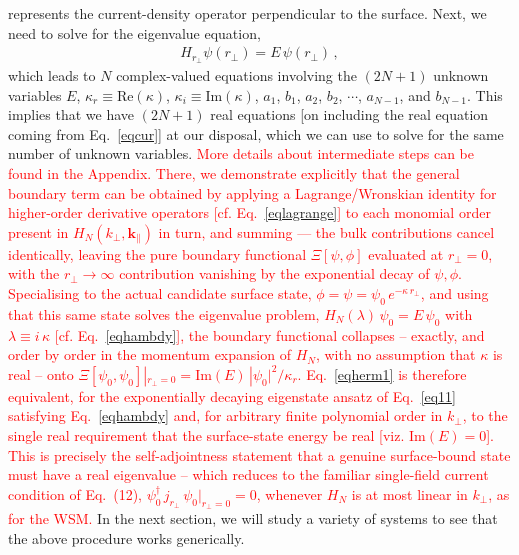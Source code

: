 \documentclass[aps,prb,onecolumn, footinbib, 10pt]{revtex4-2}
\begin{document}
represents the current-density operator perpendicular to the surface. Next, we need to solve for the eigenvalue equation,
\begin{align}
\label{eqhambdy}
H_{r_\perp} \psi (r_\perp) = E\, \psi (r_\perp)\,,
\end{align}
which leads to $N$ complex-valued equations involving the $(2N+1)$ unknown variables $ E$,
$\kappa_r \equiv \text{Re}(\kappa)$, $\kappa_i \equiv \text{Im}(\kappa)$, $a_1$, $ b_1$, $a_2$, $ b_2$, $\cdots$, $a_{N-1}$,
and $b_{N-1}$. This implies that we have $(2N+1)$ real equations [on including the real equation coming from Eq.~\eqref{eqcur}] at our disposal, which we can use to solve for the same number of unknown variables.
\textcolor{red}{More details about intermediate steps can be found in the Appendix. There, we demonstrate explicitly that the general boundary term can be obtained by applying a Lagrange/Wronskian identity for higher-order derivative operators [cf. Eq.~\eqref{eqlagrange}] to each monomial order present in $H_N(k_\perp,\boldsymbol{k}_\parallel)$ in turn, and summing --- the bulk contributions cancel identically, leaving the pure boundary functional $\Xi[\psi,\phi]$ evaluated at $r_\perp=0$, with the $r_\perp\to\infty$ contribution vanishing by the exponential decay of $\psi,\phi$. Specialising to the actual candidate surface state, $\phi=\psi=\psi_0\,e^{-\kappa \, r_\perp}$, and using that this same state solves the eigenvalue problem, $H_N(\lambda)\,\psi_0=E \, \psi_0$ with $\lambda\equiv i\,\kappa$ [cf. Eq.~\eqref{eqhambdy}], the boundary functional collapses -- exactly, and order by order in the momentum expansion of $H_N$, with no assumption that $\kappa$ is real -- onto $\Xi[\psi_0,\psi_0]|_{r_\perp=0}=\mathrm{Im}(E)\,|\psi_0|^2/\kappa_r$. Eq.~\eqref{eqherm1} is therefore equivalent, for the exponentially
decaying eigenstate ansatz of Eq.~\eqref{eq11} satisfying Eq.~\eqref{eqhambdy} and, for arbitrary finite polynomial order in
$k_\perp$, to the single real requirement that the surface-state energy be real [viz. $\mathrm{Im}(E)=0 $]. This is precisely the self-adjointness statement that a genuine surface-bound state must have a real eigenvalue -- which reduces to the familiar single-field current condition of Eq.~(12), $\psi_0^\dagger\, j_{r_\perp}\,\psi_0|_{r_\perp=0}=0$, whenever $H_N$ is at most linear in $k_\perp$, as for the WSM.}
In the next section, we will study a variety of systems to see that the above procedure works generically.


\end{document}

